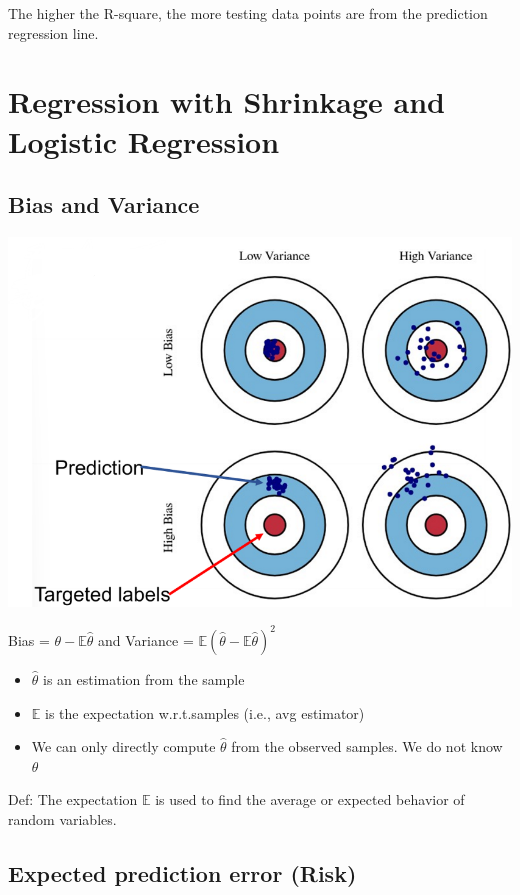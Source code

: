 \documentclass[letterpaper,12pt]{article}
\begin{document}
The higher the R-square, the more testing data points are from the prediction
regression line.

\section{Regression with Shrinkage and Logistic Regression}

\subsection{Bias and Variance}

\includegraphics*[scale = 0.9]{./Image/Bias_Variance.png}

Bias = $\theta - \mathbb{E}\hat{\theta}$ and Variance =
$\mathbb{E}(\hat{\theta} - \mathbb{E}\hat{\theta})^2$

\begin{itemize}
    \item $\hat{\theta}$ is an estimation from the sample
    \item $\mathbb{E}$ is the expectation w.r.t.samples (i.e., avg estimator)
    \item We can only directly compute $\hat{\theta}$ from the observed samples. We do
          not know $\theta$
\end{itemize}

Def: The expectation $\mathbb{E}$ is used to find the average or expected
behavior of random variables.

\subsection{Expected prediction error (Risk)}
\end{document}

